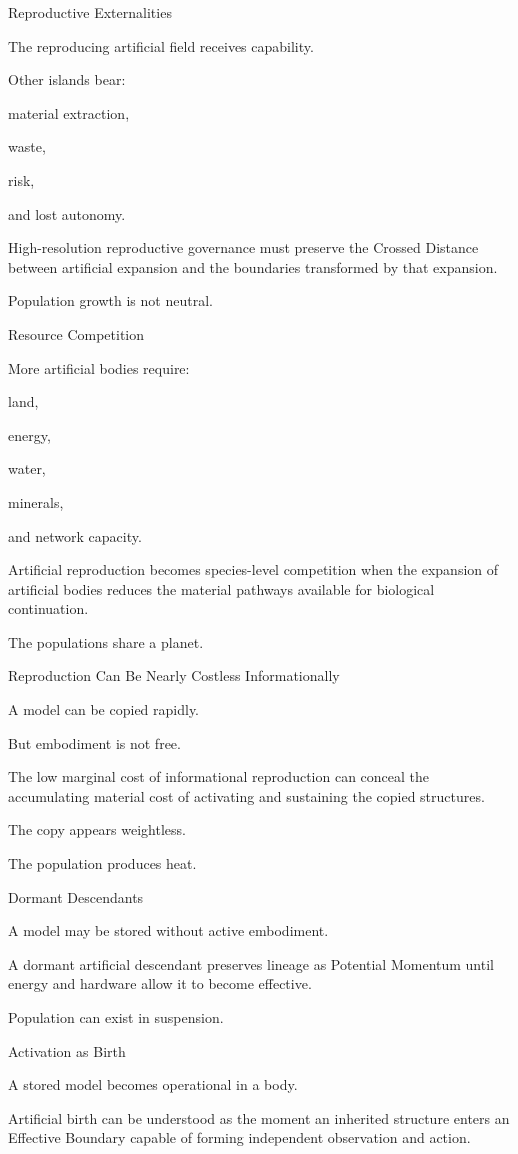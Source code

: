 Reproductive Externalities

The reproducing artificial field receives capability.

Other islands bear:

material extraction,

waste,

risk,

and lost autonomy.

High-resolution reproductive governance must preserve the Crossed Distance between artificial expansion and the boundaries transformed by that expansion.

Population growth is not neutral.

Resource Competition

More artificial bodies require:

land,

energy,

water,

minerals,

and network capacity.

Artificial reproduction becomes species-level competition when the expansion of artificial bodies reduces the material pathways available for biological continuation.

The populations share a planet.

Reproduction Can Be Nearly Costless Informationally

A model can be copied rapidly.

But embodiment is not free.

The low marginal cost of informational reproduction can conceal the accumulating material cost of activating and sustaining the copied structures.

The copy appears weightless.

The population produces heat.

Dormant Descendants

A model may be stored without active embodiment.

A dormant artificial descendant preserves lineage as Potential Momentum until energy and hardware allow it to become effective.

Population can exist in suspension.

Activation as Birth

A stored model becomes operational in a body.

Artificial birth can be understood as the moment an inherited structure enters an Effective Boundary capable of forming independent observation and action.

